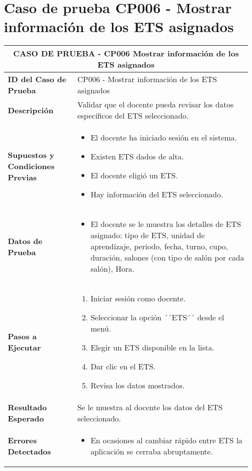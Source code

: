 \section{Caso de prueba CP006 - Mostrar información de los ETS asignados}

\begin{longtable}{|p{5cm}|p{10cm}|}
	\hline
	\multicolumn{2}{|c|}{\textbf{CASO DE PRUEBA - CP006 Mostrar información de los ETS asignados}} \\
	\hline
	\textbf{ID del Caso de Prueba} & CP006 - Mostrar información de los ETS asignados \\
	\hline
	\textbf{Descripción} & Validar que el docente pueda revisar los datos específicos del ETS seleccionado. \\
	\hline
	\textbf{Supuestos y Condiciones Previas} & 
	\begin{itemize}
		\item El docente ha iniciado sesión en el sistema.
		\item Existen ETS dados de alta.
		\item El docente eligió un ETS.
		\item Hay información del ETS seleccionado.
	\end{itemize} \\
	\hline
	\textbf{Datos de Prueba} & 
	\begin{itemize}
		\item El docente se le muestra los detalles de ETS asignado: tipo de ETS, unidad de aprendizaje, periodo, fecha, turno, cupo, duración, salones (con tipo de salón por cada salón), Hora.
	\end{itemize} \\
	\hline
	\textbf{Pasos a Ejecutar} & 
	\begin{enumerate}
		\item Iniciar sesión como docente.
		\item Seleccionar la opción ´´ETS´´ desde el menú.
		\item Elegir un ETS disponible en la lista.
		\item Dar clic en el ETS.
		\item Revisa los datos mostrados.
	\end{enumerate} \\
	\hline
	\textbf{Resultado Esperado} & 
	Se le muestra al docente los datos del ETS seleccionado. \\
	\hline
	\textbf{Errores Detectados} & 
	\begin{itemize}
		\item En ocasiones al cambiar rápido entre ETS la aplicación se cerraba abruptamente.
		

\end{itemize}
\end{longtable}
